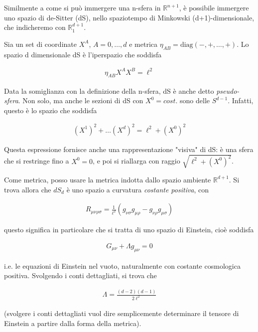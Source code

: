 \documentclass{report}
\begin{document}
Similmente a come si può immergere una n-sfera in \(\mathbb{R}^{n+1}\), è possibile immergere uno spazio di de-Sitter (dS), nello spaziotempo di Minkowski (d+1)-dimensionale, che indicheremo con \(\mathbb{R}^{d+1}_1\). 

Sia un set di coordinate \(X^A\), \(A = 0, \ldots, d\) e metrica \(\eta_{AB} = \text{diag}(-, +, \ldots, +)\). Lo spazio d dimensionale dS è l'iperspazio che soddisfa 

\begin{align}
    \eta_{AB}X^A X^B = \ell^2
\end{align}

Data la somiglianza con la definizione della n-sfera, dS è anche detto \emph{pseudo-sfera}. Non solo, ma anche le sezioni di dS con \(X^0 = cost.\) sono delle \(S^{d-1}\). Infatti, questo è lo spazio che soddisfa 

\begin{align}
    (X^1)^2 + \ldots (X^d)^2 = \ell^2 + (X^0)^2
\end{align}

Questa espressione fornisce anche una rappresentazione "visiva" di dS: è una sfera che si restringe fino a \(X^0 = 0\), e poi si riallarga con raggio \(\sqrt{\ell^2 + (X^0)^2}\). 

Come metrica, posso usare la metrica indotta dallo spazio ambiente \(\mathbb{R}^{d+1}\). Si trova allora che \(dS_d\) è uno spazio a curvatura \emph{costante positiva}, con 

\begin{align}
    R_{\mu\nu\rho\sigma} = \frac{1}{\ell^2}(g_{\nu\sigma}g_{\mu\rho} - g_{\nu\rho}g_{\mu\sigma})
\end{align}

questo significa in particolare che si tratta di uno spazio di Einstein, cioè soddisfa 

\begin{align}
    G_{\mu\nu} + \Lambda g_{\mu\nu} = 0 
\end{align}

i.e. le equazioni di Einstein nel vuoto, naturalmente con costante cosmologica positiva. Svolgendo i conti dettagliati, si trova che 

\begin{align}
    \Lambda = \frac{(d-2)(d-1)}{2\ell^2}
\end{align}

(svolgere i conti dettagliati vuol dire semplicemente determinare il tensore di Einstein a partire dalla forma della metrica). 
\end{document}
